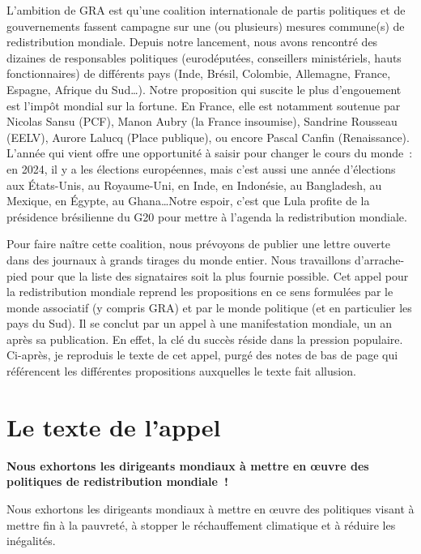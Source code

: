 \documentclass[a5paper,french]{memoir}
\begin{document}
L'ambition de GRA est qu'une coalition internationale de partis politiques et de gouvernements fassent campagne sur une (ou plusieurs) mesures commune(s) de redistribution mondiale. Depuis notre lancement, nous avons rencontré des dizaines de responsables politiques (eurodéputé\textperiodcentered{}e\textperiodcentered{}s, conseillers ministériels, hauts fonctionnaires) de différents pays (Inde, Brésil, Colombie, Allemagne, France, Espagne, Afrique du Sud\dots). Notre proposition qui suscite le plus d'engouement est l'impôt mondial sur la fortune. En France, elle est notamment soutenue par Nicolas Sansu (PCF), Manon Aubry (la France insoumise), Sandrine Rousseau (EELV), Aurore Lalucq (Place publique), ou encore Pascal Canfin (Renaissance). L'année qui vient offre une opportunité à saisir pour changer le cours du monde~: en 2024, il y a les élections européennes, mais c'est aussi une année d'élections aux États-Unis, au Royaume-Uni, en Inde, en Indonésie, au Bangladesh, au Mexique, en Égypte, au Ghana\dots Notre espoir, c'est que Lula profite de la présidence brésilienne du G20 pour mettre à l'agenda la redistribution mondiale. 

Pour faire naître cette coalition, nous prévoyons de publier une lettre ouverte dans des journaux à grands tirages du monde entier. Nous travaillons d'arrache-pied pour que la liste des signataires soit la plus fournie possible. Cet appel pour la redistribution mondiale reprend les propositions en ce sens formulées par le monde  associatif (y compris GRA) et par le monde politique (et en particulier les pays du Sud). Il se conclut par un appel à une manifestation mondiale, un an après sa publication. En effet, la clé du succès réside dans la pression populaire. Ci-après, je reproduis le texte de cet appel, purgé des notes de bas de page qui référencent les différentes propositions auxquelles le texte fait allusion. 

\section{Le texte de l'appel}

\begin{center}
\textbf{Nous exhortons les dirigeants mondiaux à mettre en œuvre des politiques de redistribution mondiale~!}
\end{center}

Nous exhortons les dirigeants mondiaux à mettre en œuvre des politiques visant à mettre fin à la pauvreté, à stopper le réchauffement climatique et à réduire les inégalités. 
\end{document}
